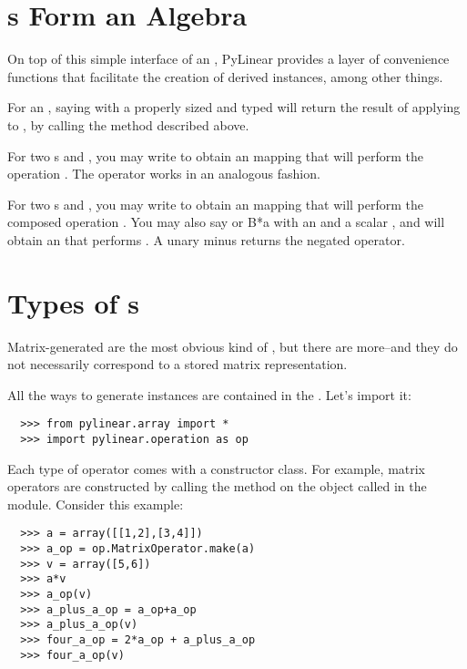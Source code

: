 \section{s Form an Algebra}

On top of this simple interface of an , PyLinear 
provides a layer of convenience functions that facilitate the
creation of derived instances, among other things.

\opindex{()}For an  , saying 
with a properly sized and typed   will
return the result of applying  to , by calling the
 method described above.

\opindex{+}For two s  and , you may write
 to obtain an  mapping that will
perform the operation . The operator \code{-} works
in an analogous fashion.

\opindex{*}For two s  and , you may
write  to obtain an  mapping that will
perform the composed operation . You may also say
 or {B*a} with an   and a scalar
, and will obtain an  that performs
. A unary minus  returns the negated
operator.

\section{Types of s}

Matrix-generated are the most obvious kind of , but 
there are more--and they do not necessarily correspond to a stored
matrix representation.

All the ways to generate  instances are contained 
in the . Let's import it:
\begin{verbatim}
  >>> from pylinear.array import *
  >>> import pylinear.operation as op
\end{verbatim}

Each type of operator comes with a constructor class. For example,
matrix operators are constructed by calling the method 
on the object called  in the  
module. Consider this example:
\begin{verbatim}
  >>> a = array([[1,2],[3,4]])
  >>> a_op = op.MatrixOperator.make(a)
  >>> v = array([5,6])
  >>> a*v
  >>> a_op(v)
  >>> a_plus_a_op = a_op+a_op
  >>> a_plus_a_op(v)
  >>> four_a_op = 2*a_op + a_plus_a_op
  >>> four_a_op(v)
\end{verbatim}

